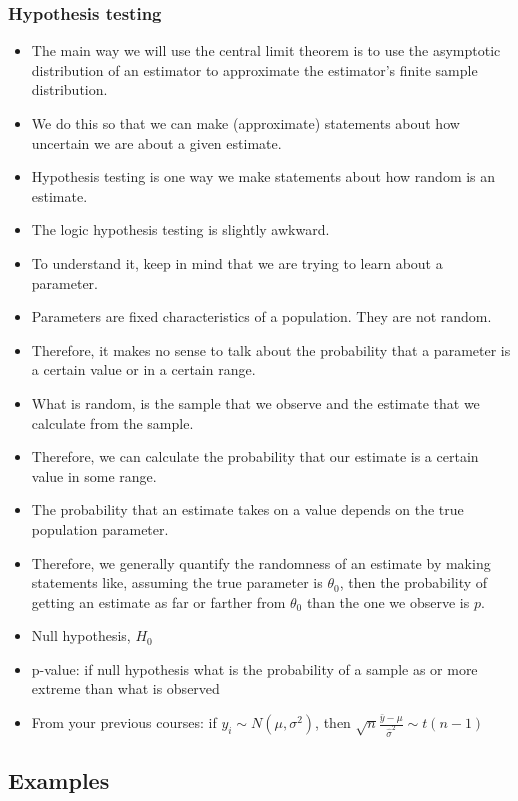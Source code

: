 \begin{frame}[allowframebreaks] 
  \frametitle{Hypothesis testing}
  \begin{itemize}
  \item The main way we will use the central limit theorem is to use the
asymptotic distribution of an estimator to approximate the estimator's
finite sample distribution. 

\item We do this so that we can make
(approximate) statements about how uncertain we are about a given
estimate. 

\item Hypothesis testing is one way we make statements about how random is
an estimate. 
\item The logic hypothesis testing is slightly awkward. 
\item To understand it, keep in mind that we are trying to learn about a
parameter.
\item  Parameters are fixed characteristics of a population. They
are not random. 
\item Therefore, it makes no sense to talk about the
probability that a parameter is a certain value or in a certain
range. 
\item What is random, is the sample that we observe and the estimate
that we calculate from the sample. 
\item Therefore, we can calculate the
probability that our estimate is a certain value in some range. 
\item The probability that an estimate takes on a value depends on the true
population parameter. 
\item Therefore, we generally quantify the randomness
of an estimate by making statements like, assuming the true parameter
is $\theta_0$, then the probability of getting an estimate as far or
farther from $\theta_0$ than the one we observe is $p$. 


  \item \alert{Null hypothesis}, $H_0$
  \item \alert{p-value}: if null hypothesis what is the probability of
    a sample as or more extreme than what is observed
  \item From your previous courses: if $y_i \sim N(\mu,\sigma^2)$, then $\sqrt{n}
    \frac{\bar{y} - \mu}{\hat{\sigma}^2} \sim t(n-1)$ 
  \end{itemize}
\end{frame}

\subsection{Examples}

